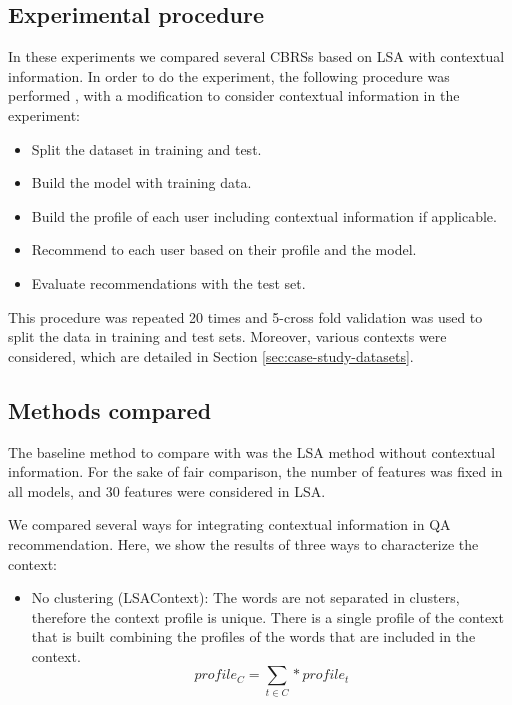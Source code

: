 \documentclass[preprint]{elsarticle}
\begin{document}
\begin{spacing}{1.5}
\subsection{Experimental procedure}

In these experiments we compared several CBRSs based on LSA with contextual information. In order to do the experiment, the following procedure was performed \cite{Sarwar2001}, with a modification to consider contextual information in the experiment:
\begin{itemize}
	\item Split the dataset in training and test.
	\item Build the model with training data.
	\item Build the profile of each user including contextual information if applicable.
	\item Recommend to each user based on their profile and the model.
	\item Evaluate recommendations with the test set.
\end{itemize}

This procedure was repeated 20 times and 5-cross fold validation was used to split the data in training and test sets. Moreover, various contexts were considered, which are detailed in Section \ref{sec:case-study-datasets}.

\subsection{Methods compared}

The baseline method to compare with was the LSA method without contextual information. For the sake of fair comparison, the number of features was fixed in all models, and 30 features were considered in LSA.

We compared several ways for integrating contextual information in QA recommendation. Here, we show the results of three ways to characterize the context:

\begin{itemize}

	\item No clustering (LSAContext): The words are not separated in clusters, therefore the context profile is unique. There is a single profile of the context that is built combining the profiles of the words that are included in the context.
	\begin{equation}
		profile_{C} = \sum_{t \in C} * profile_t
	\end{equation}


\end{itemize}
\end{spacing}
\end{document}
